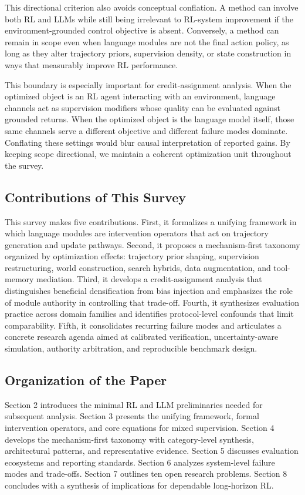\documentclass[pdflatex,sn-mathphys-num]{sn-jnl}
\begin{document}
This directional criterion also avoids conceptual conflation. A method can involve both RL and LLMs while still being irrelevant to RL-system improvement if the environment-grounded control objective is absent. Conversely, a method can remain in scope even when language modules are not the final action policy, as long as they alter trajectory priors, supervision density, or state construction in ways that measurably improve RL performance.

This boundary is especially important for credit-assignment analysis. When the optimized object is an RL agent interacting with an environment, language channels act as supervision modifiers whose quality can be evaluated against grounded returns. When the optimized object is the language model itself, those same channels serve a different objective and different failure modes dominate. Conflating these settings would blur causal interpretation of reported gains. By keeping scope directional, we maintain a coherent optimization unit throughout the survey.

\subsection{Contributions of This Survey}
This survey makes five contributions. First, it formalizes a unifying framework in which language modules are intervention operators that act on trajectory generation and update pathways. Second, it proposes a mechanism-first taxonomy organized by optimization effects: trajectory prior shaping, supervision restructuring, world construction, search hybrids, data augmentation, and tool-memory mediation. Third, it develops a credit-assignment analysis that distinguishes beneficial densification from bias injection and emphasizes the role of module authority in controlling that trade-off. Fourth, it synthesizes evaluation practice across domain families and identifies protocol-level confounds that limit comparability. Fifth, it consolidates recurring failure modes and articulates a concrete research agenda aimed at calibrated verification, uncertainty-aware simulation, authority arbitration, and reproducible benchmark design.

\subsection{Organization of the Paper}
Section 2 introduces the minimal RL and LLM preliminaries needed for subsequent analysis. Section 3 presents the unifying framework, formal intervention operators, and core equations for mixed supervision. Section 4 develops the mechanism-first taxonomy with category-level synthesis, architectural patterns, and representative evidence. Section 5 discusses evaluation ecosystems and reporting standards. Section 6 analyzes system-level failure modes and trade-offs. Section 7 outlines ten open research problems. Section 8 concludes with a synthesis of implications for dependable long-horizon RL.
\end{document}
